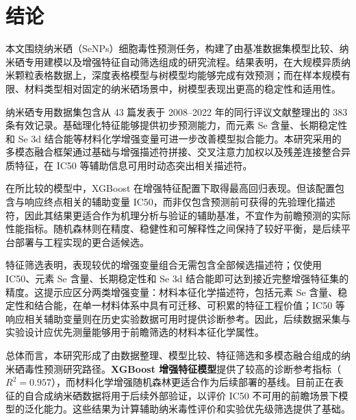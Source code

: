 \section{结论}

本文围绕纳米硒（SeNPs）细胞毒性预测任务，构建了由基准数据集模型比较、纳米硒专用建模以及增强特征自动筛选组成的研究流程。结果表明，在大规模异质纳米颗粒表格数据上，深度表格模型与树模型均能够完成有效预测；而在样本规模有限、材料类型相对固定的纳米硒场景中，树模型表现出更高的稳定性和适用性。

纳米硒专用数据集包含从 43 篇发表于 2008--2022 年的同行评议文献整理出的 383 条有效记录。基础理化特征能够提供初步预测能力，而元素 Se 含量、长期稳定性和 Se 3d 结合能等材料化学增强变量可进一步改善模型拟合能力。本研究采用的多模态融合框架通过基础与增强描述符拼接、交叉注意力加权以及残差连接整合异质特征，在 IC50 等辅助信息可用时动态突出相关描述符。

在所比较的模型中，XGBoost 在增强特征配置下取得最高回归表现。但该配置包含与响应终点相关的辅助变量 IC50，而非仅包含预测前可获得的先验理化描述符，因此其结果更适合作为机理分析与验证的辅助基准，不宜作为前瞻预测的实际性能指标。随机森林则在精度、稳健性和可解释性之间保持了较好平衡，是后续平台部署与工程实现的更合适候选。

特征筛选表明，表现较优的增强变量组合无需包含全部候选描述符；仅使用 IC50、元素 Se 含量、长期稳定性和 Se 3d 结合能即可达到接近完整增强特征集的精度。这提示应区分两类增强变量：材料本征化学描述符，包括元素 Se 含量、稳定性和结合能，在单一材料体系中具有可迁移、可积累的特征工程价值；IC50 等响应相关辅助变量则在历史实验数据可用时提供诊断参考。因此，后续数据采集与实验设计应优先测量能够用于前瞻筛选的材料本征化学属性。

总体而言，本研究形成了由数据整理、模型比较、特征筛选和多模态融合组成的纳米硒毒性预测研究路径。\textbf{XGBoost 增强特征模型}提供了较高的诊断参考指标（$R^2=0.957$），而材料化学增强随机森林更适合作为后续部署的基线。目前正在表征的自合成纳米硒数据将用于后续外部验证，以评价 IC50 不可用的前瞻场景下模型的泛化能力。这些结果为计算辅助纳米毒性评价和实验优先级筛选提供了基础。
